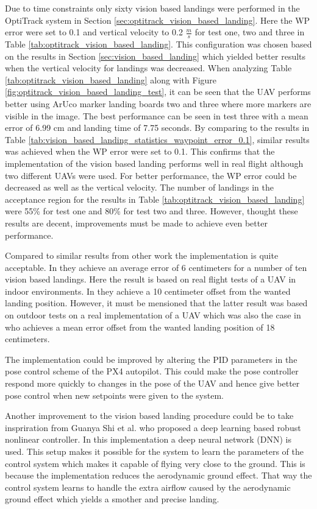 \documentclass[../Head/report.tex]{subfiles}
\begin{document}
Due to time constraints only sixty vision based landings were performed in the OptiTrack system in Section \ref{sec:optitrack_vision_based_landing}. Here the WP error were set to 0.1 and vertical velocity to 0.2 $\frac{m}{s}$ for test one, two and three in Table \ref{tab:optitrack_vision_based_landing}. This configuration was chosen based on the results in Section \ref{sec:vision_based_landing} which yielded better results when the vertical velocity for landings was decreased. When analyzing Table \ref{tab:optitrack_vision_based_landing} along with Figure \ref{fig:optitrack_vision_based_landing_test}, it can be seen that the UAV performs better using ArUco marker landing boards two and three where more markers are visible in the image. The best performance can be seen in test three with a mean error of 6.99 cm and landing time of 7.75 seconds. By comparing to the results in Table \ref{tab:vision_based_landing_statistics_waypoint_error_0.1}, similar results was achieved when the WP error were set to 0.1. This confirms that the implementation of the vision based landing performs well in real flight although two different UAVs were used. For better performance, the WP error could be decreased as well as the vertical velocity. The number of landings in the acceptance region for the results in Table \ref{tab:optitrack_vision_based_landing} were 55\% for test one and 80\% for test two and three. However, thought these results are decent, improvements must be made to achieve even better performance.  

Compared to similar results from other work the implementation is quite acceptable. In \cite[p.~5]{AutomaticnavigationandlandingofanindoorAR} they achieve an average error of 6 centimeters for a number of ten vision based landings. Here the result is based on real flight tests of a UAV in indoor environments. In \cite[p.~56]{AutonomousRechargingSystemforDronesTwo} they achieve a 10 centimeter offset from the wanted landing position. However, it must be mensioned that the latter result was based on outdoor tests on a real implementation of a UAV which was also the case in \cite[p.~6]{AVisionBasedSystemForAutonomousVerticaLanding} who achieves a mean error offset from the wanted landing position of 18 centimeters.  

The implementation could be improved by altering the PID parameters in the pose control scheme of the PX4 autopilot. This could make the pose controller respond more quickly to changes in the pose of the UAV and hence give better pose control when new setpoints were given to the system.    

Another improvement to the vision based landing procedure could be to take inspriration from Guanya Shi et al. \cite{NeuralLander} who proposed a deep
learning based robust nonlinear controller. In this implementation a deep neural network (DNN) is used. This setup makes it possible for the system to learn the parameters of the control system which makes it capable of flying very close to the ground. This is because the implementation reduces the aerodynamic ground effect. That way the control system learns to handle the extra airflow caused by the aerodynamic ground effect which yields a smother and precise landing.  
\end{document}

